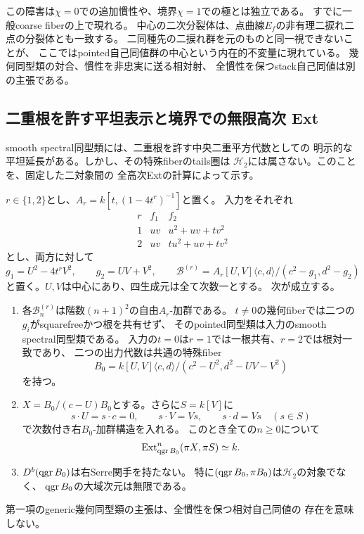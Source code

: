 \begin{remark}[幾何慣性とbandを区別する]
この障害は$\chi=0$での追加慣性や、境界$\chi=1$での極とは独立である。
すでに一般coarse fiberの上で現れる。
中心の二次分裂体は、点曲線$E_f$の非有理二捩れ二点の分裂体とも一致する。
二同種先の二捩れ群を元のものと同一視できないことが、
ここではpointed自己同値群の中心という内在的不変量に現れている。
幾何同型類の対合、慣性を非忠実に送る相対射、
全慣性を保つstack自己同値は別の主張である。
\end{remark}

\subsection{二重根を許す平坦表示と境界での無限高次 Ext}
\label{subsec:qa-spectral-singular-boundary}

smooth spectral同型類には、二重根を許す中央二重平方代数としての
明示的な平坦延長がある。しかし、その特殊fiberのtails圏は
$\mathcal H_2$には属さない。このことを、固定した二対象間の
全高次Extの計算によって示す。

\begin{proposition}[両境界traitのgeneric像に対する平坦な代数モデル]
\label{prop:qa-spectral-flat-singular-boundary}
$r\in\{1,2\}$とし、$A_r=k[t,(1-4t^r)^{-1}]$と置く。
入力をそれぞれ
\[
 \begin{array}{c|c|c}
 r&f_1&f_2\\\hline
 1&uv&u^2+uv+tv^2\\
 2&uv&tu^2+uv+tv^2
 \end{array}
\]
とし、両方に対して
\[
 g_1=U^2-4t^rV^2,\qquad g_2=UV+V^2,
 \qquad
 \mathcal B^{(r)}=A_r[U,V]\langle c,d\rangle/
       (c^2-g_1,d^2-g_2)
\]
と置く。$U,V$は中心にあり、四生成元は全て次数一とする。
次が成立する。
\begin{enumerate}
\item 各$\mathcal B^{(r)}_n$は階数$(n+1)^2$の自由$A_r$-加群である。
  $t\ne0$の幾何fiberでは二つの$g_i$がsquarefreeかつ根を共有せず、
  そのpointed同型類は入力のsmooth spectral同型類である。
  入力の$t=0$は$r=1$では一根共有、$r=2$では根対一致であり、
  二つの出力代数は共通の特殊fiber
  \[
   B_0=k[U,V]\langle c,d\rangle/
       (c^2-U^2,d^2-UV-V^2)
  \]
  を持つ。
\item
  $X=B_0/(c-U)B_0$とする。さらに$S=k[V]$に
  \[
   s\cdot U=s\cdot c=0,\qquad
   s\cdot V=Vs,\qquad s\cdot d=Vs
   \quad(s\in S)
  \]
  で次数付き右$B_0$-加群構造を入れる。
  このとき全ての$n\ge0$について
  \begin{equation}
    \operatorname{Ext}^n_{\operatorname{qgr} B_0}(\pi X,\pi S)\simeq k.
    \label{eq:qa-spectral-boundary-infinite-ext}
  \end{equation}
\item $D^b(\operatorname{qgr} B_0)$は右Serre関手を持たない。
  特に$(\operatorname{qgr} B_0,\pi B_0)$は$\mathcal H_2$の対象でなく、
  $\operatorname{qgr} B_0$の大域次元は無限である。
\end{enumerate}
第一項のgeneric幾何同型類の主張は、全慣性を保つ相対自己同値の
存在を意味しない。
\end{proposition}


